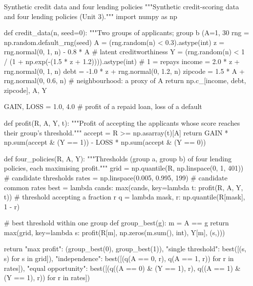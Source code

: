 \begin{pylisting}[label={lst:credit}]{Synthetic credit data and four lending policies}
"""Synthetic credit-scoring data and four lending policies (Unit 3)."""
import numpy as np

def credit_data(n, seed=0):
    """Two groups of applicants; group b (A=1, 30%
    rng = np.random.default_rng(seed)
    A = (rng.random(n) < 0.3).astype(int)
    z = rng.normal(0, 1, n) - 0.8 * A                       # latent creditworthiness
    Y = (rng.random(n) < 1 / (1 + np.exp(-(1.5 * z + 1.2)))).astype(int)   # 1 = repays
    income = 2.0 * z + rng.normal(0, 1, n)
    debt = -1.0 * z + rng.normal(0, 1.2, n)
    zipcode = 1.5 * A + rng.normal(0, 0.6, n)               # neighbourhood: a proxy of A
    return np.c_[income, debt, zipcode], A, Y

GAIN, LOSS = 1.0, 4.0                    # profit of a repaid loan, loss of a default

def profit(R, A, Y, t):
    """Profit of accepting the applicants whose score reaches their group's threshold."""
    accept = R >= np.asarray(t)[A]
    return GAIN * np.sum(accept & (Y == 1)) - LOSS * np.sum(accept & (Y == 0))

def four_policies(R, A, Y):
    """Thresholds (group a, group b) of four lending policies, each maximising profit."""
    grid = np.quantile(R, np.linspace(0, 1, 401))           # candidate thresholds
    rates = np.linspace(0.005, 0.995, 199)                  # candidate common rates
    best = lambda cands: max(cands, key=lambda t: profit(R, A, Y, t))
    # threshold accepting a fraction r
    q = lambda mask, r: np.quantile(R[mask], 1 - r)

    # best threshold within one group
    def group_best(g):
        m = A == g
        return max(grid, key=lambda s: profit(R[m], np.zeros(m.sum(), int), Y[m], (s,)))

    return {"max profit": (group_best(0), group_best(1)),
            "single threshold": best([(s, s) for s in grid]),
            "independence": best([(q(A == 0, r), q(A == 1, r)) for r in rates]),
            "equal opportunity": best([(q((A == 0) & (Y == 1), r),
                                       q((A == 1) & (Y == 1), r)) for r in rates])}
\end{pylisting}

